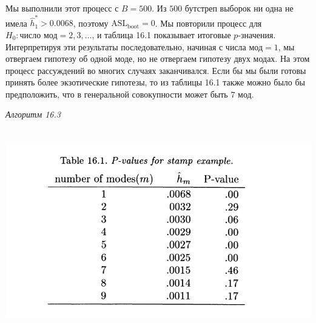 Мы выполнили этот процесс с $B = 500$. Из $500$ бутстреп выборок ни одна не имела $\hat{h}^{*}_1 > 0.0068$, поэтому $\text{ASL}_{\text{boot}} = 0$. Мы повторили процесс для $H_0: \text{число мод} = 2, 3, \ldots$, и таблица 16.1 показывает итоговые $p$-значения. Интерпретируя эти результаты последовательно, начиная с $\text{числа мод} = 1$, мы отвергаем гипотезу об одной моде, но не отвергаем гипотезу двух модах. На этом процесс рассуждений во многих случаях заканчивался. Если бы мы были готовы принять более экзотические гипотезы, то из таблицы 16.1 также можно было бы предположить, что в генеральной совокупности может быть $7$ мод.

\begin{center}
    \textit{Алгоритм 16.3}
\end{center}
\\

\noindent
\includegraphics[width=\linewidth]{16/t16.1.png}









